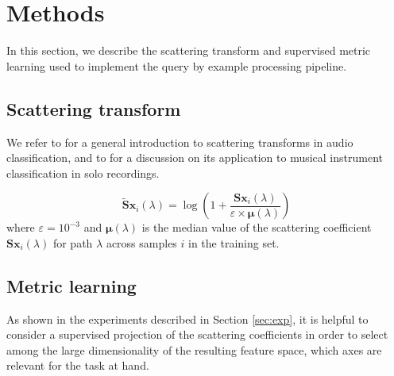 \documentclass{article}
\begin{document}



\section{Methods}

In this section, we describe the scattering transform and supervised metric learning used to implement the query by example processing pipeline.

\subsection{Scattering transform} %


We refer to \cite{anden2014taslp} for a general introduction to scattering transforms in audio classification, and to \cite{lostanlen2017phd} for a discussion on its application to musical instrument classification in solo recordings.
\cite{anden2012dafx}

\begin{equation}
\widetilde{\mathbf{S}} \boldsymbol{x}_i(\lambda) =
\log \left(
1 + \dfrac{\mathbf{S}\boldsymbol{x}_i(\lambda)}{\varepsilon \times \boldsymbol{\mu}(\lambda)}
\right)
\end{equation}
where $\varepsilon = 10^{-3}$ and $\boldsymbol{\mu}(\lambda)$ is the median value of the scattering coefficient $\mathbf{S}\boldsymbol{x}_i (\lambda)$ for path $\lambda$ across samples $i$ in the training set.


\subsection{Metric learning} %

As shown in the experiments described in Section \ref{sec:exp}, it is helpful to consider a supervised projection of the scattering coefficients in order to select among the large dimensionality of the resulting feature space, which axes are relevant for the task at hand.
\end{document}

